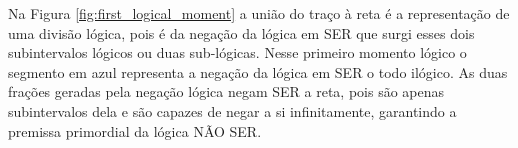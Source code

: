Na Figura \ref{fig:first_logical_moment} a união do traço à reta é a representação de uma divisão lógica, pois é da negação da lógica em SER que surgi esses dois subintervalos lógicos ou duas sub-lógicas. Nesse primeiro momento lógico o segmento em azul representa a negação da lógica em SER o todo ilógico. As duas frações geradas pela negação lógica negam SER a reta, pois são apenas subintervalos dela e são capazes de negar a si infinitamente, garantindo a premissa primordial da lógica NÃO SER. 







